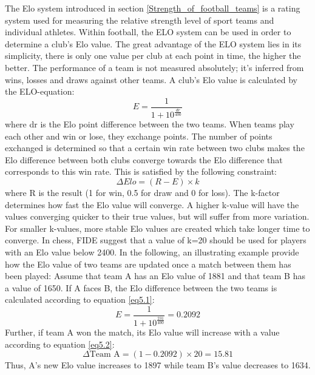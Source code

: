 The Elo system introduced in section \ref{Strength_of_football_teams} is a rating system used for measuring the relative strength level of sport teams and individual athletes. Within football, the ELO system can be used in order to determine a club's Elo value. The great advantage of the ELO system lies in its simplicity, there is only one value per club at each point in time, the higher the better. 
\newpar
The performance of a team is not measured absolutely; it's inferred from wins, losses and draws against other teams. A club's Elo value is calculated by the ELO-equation: 
\begin{equation}\label{eq5.1}
    E = \frac{1}{1+10^{\frac{dr}{400}}}
\end{equation}
where dr is the Elo point difference between the two teams.
\newpar
When teams play each other and win or lose, they exchange points. The number of points exchanged is determined so that a certain win rate between two clubs makes the Elo difference between both clubs converge towards the Elo difference that corresponds to this win rate. This is satisfied by the following constraint:
\begin{equation} \label{eq5.2}
    \Delta Elo = (R-E) \times k
\end{equation}
where R is the result (1 for win, 0.5 for draw and 0 for loss). 
\newpar
The k-factor determines how fast the Elo value will converge. A higher k-value will have the values converging quicker to their true values, but will suffer from more variation. For smaller k-values, more stable Elo values are created which take longer time to converge. In chess, FIDE suggest that a value of k=20 should be used for players with an Elo value below 2400. 
\newpar
In the following, an illustrating example provide how the Elo value of two teams are updated once a match between them has been played:
\newpar
Assume that team A has an Elo value of 1881 and that team B has a value of 1650. If A faces B, the Elo difference between the two teams is calculated according to equation \ref{eq5.1}:
\begin{equation*}
    E = \frac{1}{1+10^{\frac{231}{400}}} = 0.2092
\end{equation*}
Further, if team A won the match, its Elo value will increase with a value according to equation \ref{eq5.2}: 
\begin{equation*}
   \Delta \textrm{Team A} = (1-0.2092) \times 20 = 15.81
\end{equation*}
Thus, A's new Elo value increases to 1897 while team B's value decreases to 1634. 

